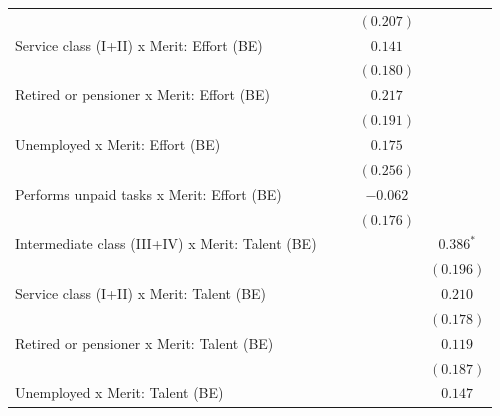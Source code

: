 \documentclass[
  12pt,
]{article}
\begin{document}
\begin{table}
\begin{center}
{\begin{tabular}{l c c c c}
                                                                &             &             & $(0.207)$   &             \\
\quad Service class (I+II) x Merit: Effort (BE)                 &             &             & $0.141$     &             \\
                                                                &             &             & $(0.180)$   &             \\
\quad Retired or pensioner x Merit: Effort (BE)                 &             &             & $0.217$     &             \\
                                                                &             &             & $(0.191)$   &             \\
\quad Unemployed x Merit: Effort (BE)                           &             &             & $0.175$     &             \\
                                                                &             &             & $(0.256)$   &             \\
\quad Performs unpaid tasks x Merit: Effort (BE)                &             &             & $-0.062$    &             \\
                                                                &             &             & $(0.176)$   &             \\
\quad Intermediate class (III+IV) x Merit: Talent (BE)          &             &             &             & $0.386^{*}$ \\
                                                                &             &             &             & $(0.196)$   \\
\quad Service class (I+II) x Merit: Talent (BE)                 &             &             &             & $0.210$     \\
                                                                &             &             &             & $(0.178)$   \\
\quad Retired or pensioner x Merit: Talent (BE)                 &             &             &             & $0.119$     \\
                                                                &             &             &             & $(0.187)$   \\
\quad Unemployed x Merit: Talent (BE)                           &             &             &             & $0.147$     \\

\end{tabular}}
\end{center}
\end{table}
\end{document}
